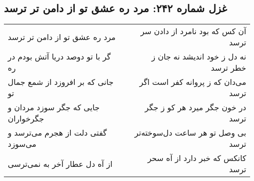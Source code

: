 \begin{center}
\section*{غزل شماره ۲۴۲: مرد ره عشق تو از دامن تر ترسد}
\label{sec:242}
\begin{longtable}{l p{0.5cm} r}
مرد ره عشق تو از دامن تر ترسد
&&
آن کس که بود نامرد از دادن سر ترسد
\\
گر با تو دوصد دریا آتش بودم در ره
&&
نه دل ز خود اندیشد نه جان ز خطر ترسد
\\
جانی که بر افروزد از شمع جمال تو
&&
می‌دان که ز پروانه کفر است اگر ترسد
\\
جایی که جگر سوزد مردان و جگرخواران
&&
در خون جگر میرد هر کو ز جگر ترسد
\\
گفتی دلت از هجرم می‌ترسد و می‌سوزد
&&
بی وصل تو هر ساعت دل‌سوخته‌تر ترسد
\\
از آه دل عطار آخر به نمی‌ترسی
&&
کانکس که خبر دارد از آه سحر ترسد
\\
\end{longtable}
\end{center}

